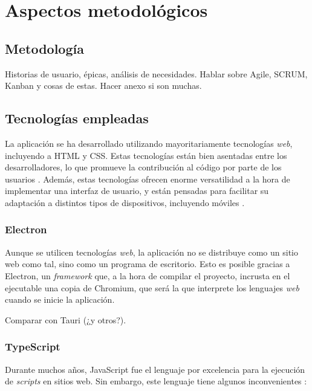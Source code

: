 \chapter{Aspectos metodológicos}  

\section{Metodología}

Historias de usuario, épicas, análisis de necesidades. Hablar sobre Agile, SCRUM, Kanban y cosas de estas.
Hacer anexo si son muchas.

\section{Tecnologías empleadas}

La aplicación se ha desarrollado utilizando mayoritariamente tecnologías \textit{web}, incluyendo a HTML y CSS. Estas tecnologías están bien asentadas entre los desarrolladores, lo que promueve la contribución al código por parte de los usuarios \citationNeeded. Además, estas tecnologías ofrecen enorme versatilidad a la hora de implementar una interfaz de usuario, y están pensadas para facilitar su adaptación a distintos tipos de dispositivos, incluyendo móviles \citationNeeded.

\subsection{Electron}

Aunque se utilicen tecnologías \textit{web}, la aplicación no se distribuye como un sitio web como tal, sino como un programa de escritorio. Esto es posible gracias a Electron, un \textit{framework} que, a la hora de compilar el proyecto, incrusta en el ejecutable una copia de Chromium, que será la que interprete los lenguajes \textit{web} cuando se inicie la aplicación. \citationNeeded

Comparar con Tauri (¿y otros?). \todo

\subsection{TypeScript}

Durante muchos años, JavaScript fue el lenguaje por excelencia para la ejecución de \textit{scripts} en sitios web. Sin embargo, este lenguaje tiene algunos inconvenientes \citationNeeded:


